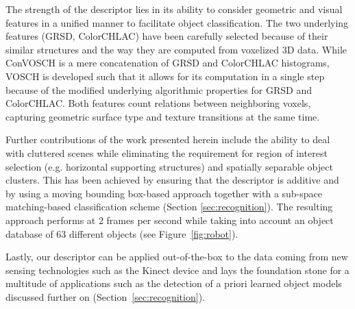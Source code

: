 \documentclass[conference]{sty/IEEEtran}
\begin{document}

The strength of the descriptor lies in its ability to consider geometric and
visual features in a unified manner to facilitate object classification. The two
underlying features (GRSD, ColorCHLAC) have been carefully selected because of 
their similar structures and the way they are computed from voxelized 3D data. 
While ConVOSCH is a mere concatenation of GRSD and ColorCHLAC histograms, 
VOSCH is developed such that it allows for its computation in a single step because 
of the modified underlying algorithmic properties for GRSD and ColorCHLAC. 
Both features count relations between neighboring voxels, capturing geometric 
surface type and texture transitions at the same time.

Further contributions of the work presented herein include the ability to deal with
cluttered scenes while eliminating the requirement for region of interest
selection (e.g. horizontal supporting structures) and spatially separable object
clusters. This has been achieved by ensuring that the descriptor is additive and by using a
moving bounding box-based approach together with a sub-space matching-based classification scheme (Section
\ref{sec:recognition}). The resulting approach performs at 2 frames per second
while taking into account an object database of 63 different objects
(see Figure~\ref{fig:robot}).




Lastly, our descriptor can be applied out-of-the-box to the data coming from 
new sensing technologies such as the Kinect device and lays the foundation stone for a
multitude of applications such as the detection of a priori learned object models discussed
further on (Section~\ref{sec:recognition}).
\end{document}
